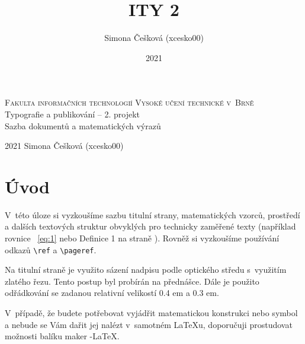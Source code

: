 \documentclass[a4paper, 11pt, twocolumn]{article}
\title{ITY 2}
\author{Simona Češková (xcesko00)}
\date{2021}
\theoremstyle{definition}
\begin{document}
\begin{titlepage}
\begin{center}
\Huge
\textsc{Fakulta informačních technologií
Vysoké učení technické v~Brně} \\
\LARGE
Typografie a publikování -- 2. projekt \\
Sazba dokumentů a matematických výrazů \\
\end{center}
{\Large 2021 \hfill Simona Češková (xcesko00)}
\end{titlepage}

\section*{Úvod} \label{1}
V~této úloze si vyzkoušíme sazbu titulní strany, matematických vzorců, prostředí a dalších textových struktur obvyklých pro technicky zaměřené texty (například rovnice~ \eqref{eq:1}
nebo Definice 1 na straně \pageref{1}). Rovněž si vyzkoušíme používání odkazů \verb!\ref! a \verb!\pageref!. \par
Na titulní straně je využito sázení nadpisu podle optického středu s~využitím zlatého řezu. Tento postup byl
probírán na přednášce. Dále je použito odřádkování se
zadanou relativní velikostí 0.4 em a 0.3 em. \par
V~případě, že budete potřebovat vyjádřit matematickou
konstrukci nebo symbol a nebude se Vám dařit jej nalézt
v~samotném \LaTeX u, doporučuji prostudovat možnosti balíku maker \AmS\--\LaTeX.
\end{document}
